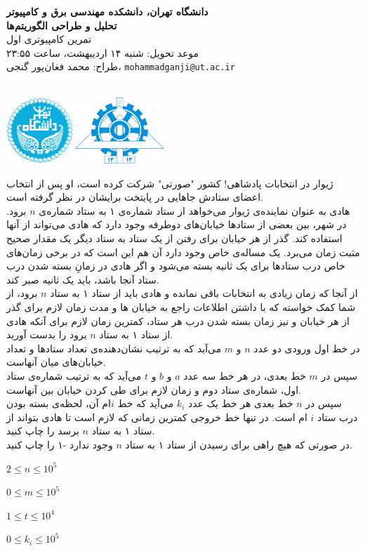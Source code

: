 \documentclass[11.5pt,a4paper,oneside]{article}
\makeatletter
\renewcommand{\contestname}{
دانشگاه تهران، دانشکده مهندسی برق و کامپیوتر \\
تحلیل و طراحی الگوریتم‌ها \\
}
\renewcommand{\contestauthor}{
تمرین کامپیوتری اول \\ موعد تحویل: شنبه ۱۴ اردیبهشت، ساعت ۲۳:۵۵ \\ طراح:‌ محمد فغان‌پور گنجی،
\texttt{mohammadganji@ut.ac.ir}
}
\makeatother
\begin{document}
{\noindent \Large \bf \contestname}
{\contestauthor}

\begin{flushleft}
\nothing\\[-3.2cm]
\includegraphics[height=2.5cm]{../../../../static/pics/ut-eng.png}
\end{flushleft}

\def\problemCode{Election}
\def\problemEnglishTitle{Election}
\def\problemFarsiTitle{انتخابات}
\def\timeLimit{$2$ \second}
\def\memLimit{$256$ \megabytes}
\begin{problem}
ژیوار در انتخابات پادشاهی! کشور "صورتی" شرکت کرده است، او پس از انتخاب اعضای ستادش جاهایی در پایتخت برایشان در نظر گرفته است.\\
هادی به عنوان نماینده‌ی ژیوار می‌خواهد از ستاد شماره‌ی ۱ به ستاد شماره‌ی $n$ برود. در شهر، بین بعضی از ستاد‌ها خیابان‌های دوطرفه وجود دارد که هادی می‌تواند از آنها استفاده کند. گذر از هر خیابان برای رفتن از یک ستاد به ستاد دیگر یک مقدار صحیح مثبت زمان می‌برد. یک مساله‌ی خاص وجود دارد آن هم این است که در برخی زمان‌های خاص درب ستاد‌ها برای یک ثانیه بسته می‌شود و اگر هادی در زمانِ بسته شدن درب ستاد آنجا باشد، باید یک ثانیه صبر کند.\\
از آنجا که زمان زیادی به انتخابات باقی نمانده و هادی باید از ستاد ۱ به ستاد $n$ برود، از شما کمک خواسته که با داشتن اطلاعات راجع به خیابان ها و مدت زمان لازم برای گذر از هر خیابان و نیز زمان بسته شدن درب هر ستاد، کمترین زمان لازم برای آنکه هادی از ستاد ۱ به ستاد $n$ برود را بدست آورید.\\
در خط اول ورودی  دو عدد $n$ و $m$ می‌آید که به ترتیب نشان‌دهنده‌ی تعداد ستاد‌ها و تعداد خیابان‌های میان آنهاست.\\
سپس در $m$ خط بعدی، در هر خط سه عدد $a$ و $b$ و $t$ می‌آید که به ترتیب شماره‌ی ستاد اول، شماره‌ی ستاد دوم و زمان لازم برای طی کردن خیابان بین آنهاست.\\
سپس در $n$ خط بعدی هر خط یک عدد $k_{i}$ می‌آید که خط $i$ام آن، لحظه‌ی بسته بودن درب ستاد $i$ ام است.
\outputDescription
در تنها خط خروجی کمترین زمانی که لازم است تا هادی بتواند از ستاد ۱ به ستاد $n$ برسد را چاپ کنید.\\
در صورتی که هیچ راهی برای رسیدن از ستاد ۱ به ستاد $n$ وجود ندارد -۱ را چاپ کنید.

\constraints
\begin{shortitems}
\item $2 \le n \le 10^5$
\item $0 \le m \le 10^5$
\item $1 \le t \le 10^4$
\item $0 \le k_{i} \le 10^5$
\end{shortitems}

\sampleIO

\begin{example}
%
%
\end{example}

\end{problem}
\end{document}
